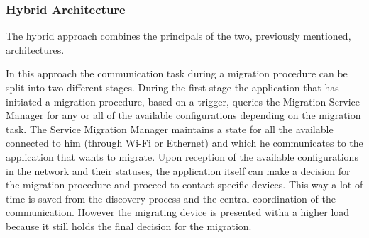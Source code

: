 \subsubsection{Hybrid Architecture}
The hybrid approach combines the principals of the two, previously mentioned, architectures.


In this approach the communication task during a migration procedure can be split into two different stages. During the first stage the application that has initiated a migration procedure, based on a trigger, queries the Migration Service Manager for any or all of the available configurations depending on the migration task. The Service Migration Manager maintains a state for all the available connected to him (through Wi-Fi or Ethernet) and which he communicates to the application that wants to migrate. Upon reception of the available configurations in the network and their statuses, the application itself can make a decision for the migration procedure and proceed to contact specific devices. This way a lot of time is saved from the discovery process and the central coordination of the communication. However the migrating device is presented witha a  higher load because it still holds the final decision for the migration.



